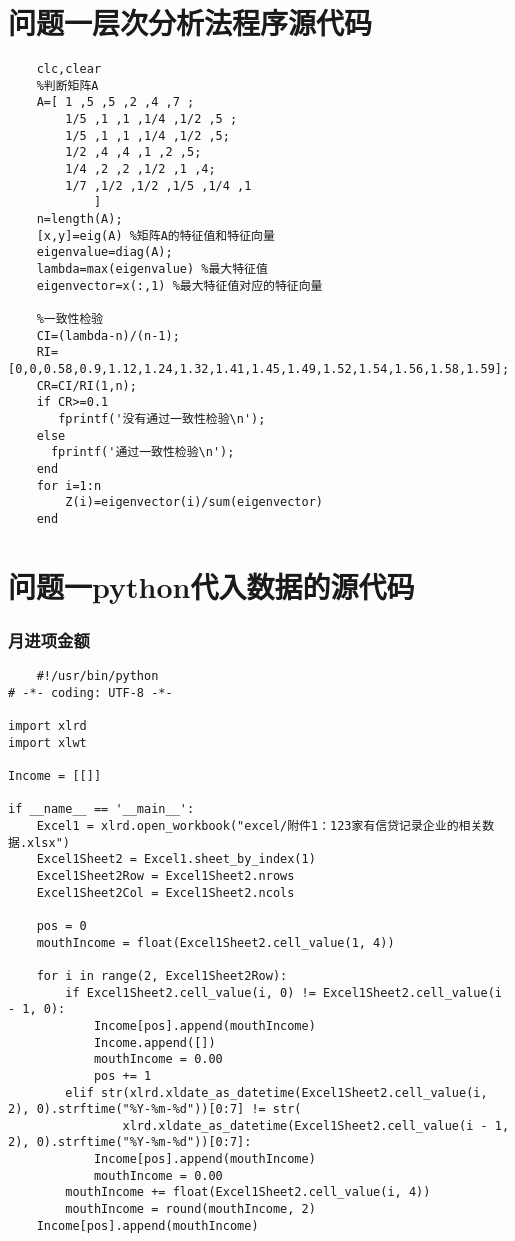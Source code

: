 \documentclass[dvipsnames,withoutpreface,bwprint]{cumcmthesis}
\begin{document}
\begin{appendices}
\section{问题一层次分析法程序源代码}
\begin{lstlisting}
    clc,clear
    %判断矩阵A
    A=[ 1 ,5 ,5 ,2 ,4 ,7 ;
        1/5 ,1 ,1 ,1/4 ,1/2 ,5 ;
        1/5 ,1 ,1 ,1/4 ,1/2 ,5;
        1/2 ,4 ,4 ,1 ,2 ,5;
        1/4 ,2 ,2 ,1/2 ,1 ,4;
        1/7 ,1/2 ,1/2 ,1/5 ,1/4 ,1
            ]
    n=length(A);
    [x,y]=eig(A) %矩阵A的特征值和特征向量
    eigenvalue=diag(A);
    lambda=max(eigenvalue) %最大特征值
    eigenvector=x(:,1) %最大特征值对应的特征向量
    
    %一致性检验
    CI=(lambda-n)/(n-1);
    RI=[0,0,0.58,0.9,1.12,1.24,1.32,1.41,1.45,1.49,1.52,1.54,1.56,1.58,1.59];
    CR=CI/RI(1,n);
    if CR>=0.1
       fprintf('没有通过一致性检验\n');
    else
      fprintf('通过一致性检验\n');
    end
    for i=1:n
        Z(i)=eigenvector(i)/sum(eigenvector)
    end
\end{lstlisting}
\section{问题一python代入数据的源代码}
\subsubsection{月进项金额}
\begin{lstlisting}
    #!/usr/bin/python
# -*- coding: UTF-8 -*-

import xlrd
import xlwt

Income = [[]]

if __name__ == '__main__':
    Excel1 = xlrd.open_workbook("excel/附件1：123家有信贷记录企业的相关数据.xlsx")
    Excel1Sheet2 = Excel1.sheet_by_index(1)
    Excel1Sheet2Row = Excel1Sheet2.nrows
    Excel1Sheet2Col = Excel1Sheet2.ncols

    pos = 0
    mouthIncome = float(Excel1Sheet2.cell_value(1, 4))

    for i in range(2, Excel1Sheet2Row):
        if Excel1Sheet2.cell_value(i, 0) != Excel1Sheet2.cell_value(i - 1, 0):
            Income[pos].append(mouthIncome)
            Income.append([])
            mouthIncome = 0.00
            pos += 1
        elif str(xlrd.xldate_as_datetime(Excel1Sheet2.cell_value(i, 2), 0).strftime("%Y-%m-%d"))[0:7] != str(
                xlrd.xldate_as_datetime(Excel1Sheet2.cell_value(i - 1, 2), 0).strftime("%Y-%m-%d"))[0:7]:
            Income[pos].append(mouthIncome)
            mouthIncome = 0.00
        mouthIncome += float(Excel1Sheet2.cell_value(i, 4))
        mouthIncome = round(mouthIncome, 2)
    Income[pos].append(mouthIncome)


\end{lstlisting}
\end{appendices}
\end{document}
